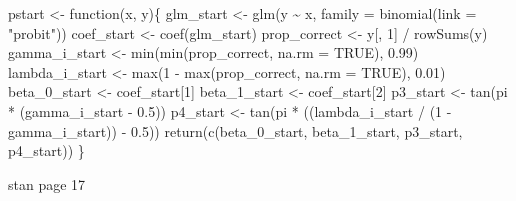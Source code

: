 \documentclass[
  letterpaper,
  DIV=11,
  numbers=noendperiod]{scrartcl}
\newenvironment{Shaded}{\begin{snugshade}}{\end{snugshade}}
\newcommand{\AttributeTok}[1]{\textcolor[rgb]{0.40,0.45,0.13}{#1}}
\newcommand{\ConstantTok}[1]{\textcolor[rgb]{0.56,0.35,0.01}{#1}}
\newcommand{\ControlFlowTok}[1]{\textcolor[rgb]{0.00,0.23,0.31}{#1}}
\newcommand{\DecValTok}[1]{\textcolor[rgb]{0.68,0.00,0.00}{#1}}
\newcommand{\FloatTok}[1]{\textcolor[rgb]{0.68,0.00,0.00}{#1}}
\newcommand{\FunctionTok}[1]{\textcolor[rgb]{0.28,0.35,0.67}{#1}}
\newcommand{\NormalTok}[1]{\textcolor[rgb]{0.00,0.23,0.31}{#1}}
\newcommand{\OtherTok}[1]{\textcolor[rgb]{0.00,0.23,0.31}{#1}}
\newcommand{\SpecialCharTok}[1]{\textcolor[rgb]{0.37,0.37,0.37}{#1}}
\newcommand{\StringTok}[1]{\textcolor[rgb]{0.13,0.47,0.30}{#1}}
\begin{document}
\begin{Shaded}
\begin{Highlighting}[]
\NormalTok{pstart }\OtherTok{\textless{}{-}} \ControlFlowTok{function}\NormalTok{(x, y)\{}
\NormalTok{  glm\_start  }\OtherTok{\textless{}{-}} \FunctionTok{glm}\NormalTok{(y }\SpecialCharTok{\textasciitilde{}}\NormalTok{ x, }\AttributeTok{family =} \FunctionTok{binomial}\NormalTok{(}\AttributeTok{link =} \StringTok{"probit"}\NormalTok{))}
\NormalTok{  coef\_start }\OtherTok{\textless{}{-}} \FunctionTok{coef}\NormalTok{(glm\_start)}
\NormalTok{  prop\_correct   }\OtherTok{\textless{}{-}}\NormalTok{ y[, }\DecValTok{1}\NormalTok{] }\SpecialCharTok{/} \FunctionTok{rowSums}\NormalTok{(y)}
\NormalTok{  gamma\_i\_start  }\OtherTok{\textless{}{-}} \FunctionTok{min}\NormalTok{(}\FunctionTok{min}\NormalTok{(prop\_correct, }\AttributeTok{na.rm =} \ConstantTok{TRUE}\NormalTok{), }\FloatTok{0.99}\NormalTok{)}
\NormalTok{  lambda\_i\_start }\OtherTok{\textless{}{-}} \FunctionTok{max}\NormalTok{(}\DecValTok{1} \SpecialCharTok{{-}} \FunctionTok{max}\NormalTok{(prop\_correct, }\AttributeTok{na.rm =} \ConstantTok{TRUE}\NormalTok{), }\FloatTok{0.01}\NormalTok{)}
\NormalTok{  beta\_0\_start   }\OtherTok{\textless{}{-}}\NormalTok{ coef\_start[}\DecValTok{1}\NormalTok{]}
\NormalTok{  beta\_1\_start   }\OtherTok{\textless{}{-}}\NormalTok{ coef\_start[}\DecValTok{2}\NormalTok{]}
\NormalTok{  p3\_start }\OtherTok{\textless{}{-}} \FunctionTok{tan}\NormalTok{(pi }\SpecialCharTok{*}\NormalTok{ (gamma\_i\_start }\SpecialCharTok{{-}} \FloatTok{0.5}\NormalTok{))}
\NormalTok{  p4\_start }\OtherTok{\textless{}{-}} \FunctionTok{tan}\NormalTok{(pi }\SpecialCharTok{*}\NormalTok{ ((lambda\_i\_start }\SpecialCharTok{/}\NormalTok{ (}\DecValTok{1} \SpecialCharTok{{-}}\NormalTok{ gamma\_i\_start)) }\SpecialCharTok{{-}} \FloatTok{0.5}\NormalTok{))}
  \FunctionTok{return}\NormalTok{(}\FunctionTok{c}\NormalTok{(beta\_0\_start, beta\_1\_start, p3\_start, p4\_start))}
\NormalTok{\}}
\end{Highlighting}
\end{Shaded}

stan page 17
\end{document}
